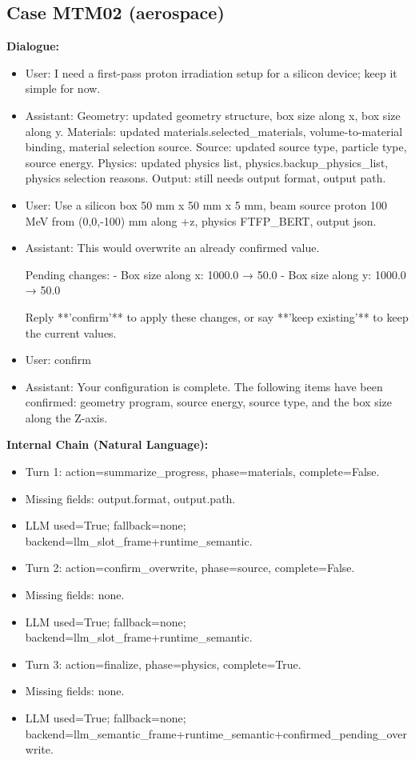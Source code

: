 \documentclass[11pt]{ctexart}
\begin{document}
\subsection{Case MTM02 (aerospace)}
\textbf{Dialogue:}
\begin{itemize}
\item User: I need a first-pass proton irradiation setup for a silicon device; keep it simple for now.
\item Assistant: Geometry: updated geometry structure, box size along x, box size along y. Materials: updated materials.selected\_materials, volume-to-material binding, material selection source. Source: updated source type, particle type, source energy. Physics: updated physics list, physics.backup\_physics\_list, physics selection reasons. Output: still needs output format, output path.
\item User: Use a silicon box 50 mm x 50 mm x 5 mm, beam source proton 100 MeV from (0,0,-100) mm along +z, physics FTFP\_BERT, output json.
\item Assistant: This would overwrite an already confirmed value.

Pending changes:
- Box size along x: 1000.0 → 50.0
- Box size along y: 1000.0 → 50.0

Reply **'confirm'** to apply these changes, or say **'keep existing'** to keep the current values.
\item User: confirm
\item Assistant: Your configuration is complete. The following items have been confirmed: geometry program, source energy, source type, and the box size along the Z-axis.
\end{itemize}
\textbf{Internal Chain (Natural Language):}
\begin{itemize}
\item Turn 1: action=summarize\_progress, phase=materials, complete=False.
\item Missing fields: output.format, output.path.
\item LLM used=True; fallback=none; backend=llm\_slot\_frame+runtime\_semantic.
\item Turn 2: action=confirm\_overwrite, phase=source, complete=False.
\item Missing fields: none.
\item LLM used=True; fallback=none; backend=llm\_slot\_frame+runtime\_semantic.
\item Turn 3: action=finalize, phase=physics, complete=True.
\item Missing fields: none.
\item LLM used=True; fallback=none; backend=llm\_semantic\_frame+runtime\_semantic+confirmed\_pending\_overwrite.
\end{itemize}
\end{document}
